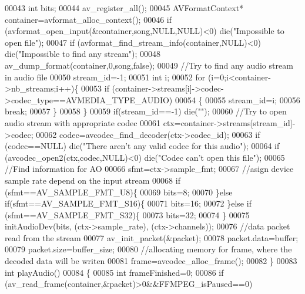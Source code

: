 \begin{DoxyCode}
{00043     \textcolor{keywordtype}{int} bits;
00044     av\_register\_all();
00045     AVFormatContext* container=avformat\_alloc\_context();
00046     \textcolor{keywordflow}{if} (avformat\_open\_input(&container,song,NULL,NULL)<0) die(\textcolor{stringliteral}{"Impossible to
       open file"});
00047     \textcolor{keywordflow}{if} (avformat\_find\_stream\_info(container,NULL)<0) die(\textcolor{stringliteral}{"Impossible to find
       any stream"});
00048     av\_dump\_format(container,0,song,\textcolor{keyword}{false});
00049     \textcolor{comment}{//Try to find any audio stream in audio file}
00050     stream\_id=-1;
00051     \textcolor{keywordtype}{int} i;
00052     \textcolor{keywordflow}{for} (i=0;i<container->nb\_streams;i++)\{
00053         \textcolor{keywordflow}{if} (container->streams[i]->codec->codec\_type==AVMEDIA\_TYPE\_AUDIO)
00054         \{
00055             stream\_id=i;
00056             \textcolor{keywordflow}{break};
00057         \}
00058     \}
00059     \textcolor{keywordflow}{if}(stream\_id==-1) die(\textcolor{stringliteral}{""});
00060     \textcolor{comment}{//Try to open audio stream with appropriate codec}
00061     ctx=container->streams[stream\_id]->codec;
00062     codec=avcodec\_find\_decoder(ctx->codec\_id);
00063     \textcolor{keywordflow}{if} (codec==NULL) die(\textcolor{stringliteral}{"There aren't any valid codec for this audio"});
00064     \textcolor{keywordflow}{if} (avcodec\_open2(ctx,codec,NULL)<0) die(\textcolor{stringliteral}{"Codec can't open this file"});
00065     \textcolor{comment}{//Find information for AO}
00066     sfmt=ctx->sample\_fmt;
00067     \textcolor{comment}{//asign device sample rate depend on the input stream}
00068     \textcolor{keywordflow}{if} (sfmt==AV\_SAMPLE\_FMT\_U8)\{
00069         bits=8;
00070     \}\textcolor{keywordflow}{else} \textcolor{keywordflow}{if}(sfmt==AV\_SAMPLE\_FMT\_S16)\{
00071         bits=16;
00072     \}\textcolor{keywordflow}{else} \textcolor{keywordflow}{if} (sfmt==AV\_SAMPLE\_FMT\_S32)\{
00073         bits=32;
00074     \}
00075     initAudioDev(bits, (ctx->sample\_rate), (ctx->channels));
00076     \textcolor{comment}{//data packet read from the stream}
00077     av\_init\_packet(&packet);
00078     packet.data=buffer;
00079     packet.size=buffer\_size;
00080     \textcolor{comment}{//allocating memory for frame, where the decoded data will be writen}
00081     frame=avcodec\_alloc\_frame();
00082 \}
00083 \textcolor{keywordtype}{int} playAudio()
00084 \{
00085     \textcolor{keywordtype}{int} frameFinished=0;
00086     \textcolor{keywordflow}{if} (av\_read\_frame(container,&packet)>0&&FFMPEG\_isPaused==0)
}
\end{DoxyCode}
